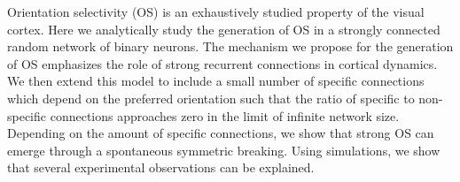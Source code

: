 Orientation selectivity (OS) is an exhaustively studied property of the visual cortex. Here we analytically study the generation of OS in a strongly connected random network of binary neurons. The mechanism we propose for the generation of OS emphasizes the role of strong recurrent connections in cortical dynamics. We then extend this model to include a small number of specific connections which depend on the preferred orientation such that the ratio of specific to non-specific connections approaches zero in the limit of infinite network size. Depending on the amount of specific connections, we show that strong OS can emerge through a spontaneous symmetric breaking. Using simulations, we show that several experimental observations can be explained. 
